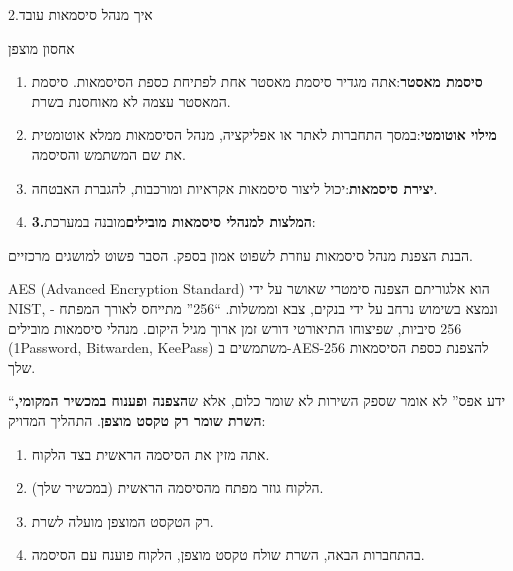 


2.איך מנהל סיסמאות עובד

אחסון מוצפן


\begin{enumerate}
  \item \textbf{סיסמת מאסטר}:אתה מגדיר סיסמת מאסטר אחת לפתיחת כספת הסיסמאות. סיסמת המאסטר עצמה לא מאוחסנת בשרת.
  \item \textbf{מילוי אוטומטי}:במסך התחברות לאתר או אפליקציה, מנהל הסיסמאות ממלא אוטומטית את שם המשתמש והסיסמה.
  \item \textbf{יצירת סיסמאות}:יכול ליצור סיסמאות אקראיות ומורכבות, להגברת האבטחה.
  \item \textbf{3.המלצות למנהלי סיסמאות מובילים}מובנה במערכת:
\end{enumerate}


הבנת הצפנת מנהל סיסמאות עוזרת לשפוט אמון בספק. הסבר פשוט למושגים מרכזיים.


AES (Advanced Encryption Standard) הוא אלגוריתם הצפנה סימטרי שאושר על ידי NIST, ונמצא בשימוש נרחב על ידי בנקים, צבא וממשלות. “256” מתייחס לאורך המפתח - 256 סיביות, שפיצוחו התיאורטי דורש זמן ארוך מגיל היקום. מנהלי סיסמאות מובילים (1Password, Bitwarden, KeePass) משתמשים ב-AES-256 להצפנת כספת הסיסמאות שלך.


“ידע אפס” לא אומר שספק השירות לא שומר כלום, אלא ש\textbf{הצפנה ופענוח במכשיר המקומי, השרת שומר רק טקסט מוצפן}. התהליך המדויק:

\begin{enumerate}
  \item אתה מזין את הסיסמה הראשית בצד הלקוח.
  \item הלקוח גוזר מפתח מהסיסמה הראשית (במכשיר שלך).
  \item רק הטקסט המוצפן מועלה לשרת.
  \item בהתחברות הבאה, השרת שולח טקסט מוצפן, הלקוח פוענח עם הסיסמה.
\end{enumerate}

